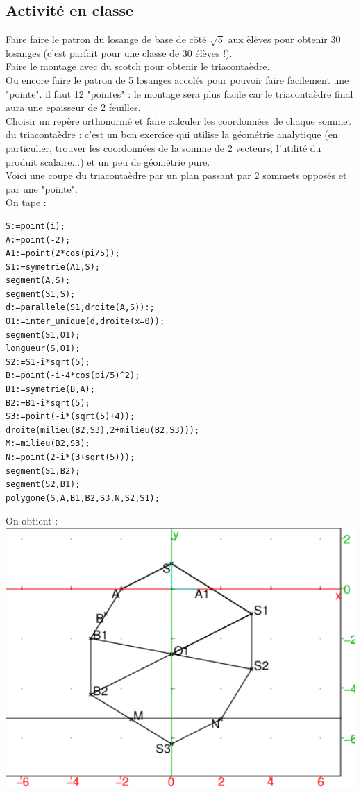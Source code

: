 \documentclass[a4paper,11pt]{book}
\begin{document}
\subsection{Activit\'e en classe}
Faire faire le patron du losange de base de c\^ot\'e $\sqrt 5$ aux \`el\`eves 
pour obtenir 30 losanges (c'est parfait pour une classe de 30 \'el\`eves !).\\
Faire le montage avec du scotch pour obtenir le triaconta\`edre.\\
Ou encore faire le patron de 5 losanges accol\'es pour pouvoir faire facilement 
une "pointe". il faut 12 "pointes" : le montage sera plus facile car le
triaconta\`edre final aura une epaisseur de 2 feuilles.\\   
Choisir un rep\`ere orthonorm\'e et faire calculer les coordonn\'ees de chaque 
sommet du triaconta\`edre : c'est un bon exercice qui utilise la g\'eom\'etrie
analytique (en particulier, trouver les coordonn\'ees de la somme de 2 vecteurs,
l'utilit\'e du produit scalaire...) et un peu de g\'eom\'etrie pure.\\
Voici une coupe du triaconta\`edre par un plan passant par 2 sommets oppos\'es 
et par une "pointe". \\
On tape :\\
\begin{verbatim}
S:=point(i);
A:=point(-2);
A1:=point(2*cos(pi/5));
S1:=symetrie(A1,S);
segment(A,S);
segment(S1,S);
d:=parallele(S1,droite(A,S)):;
O1:=inter_unique(d,droite(x=0));
segment(S1,O1);
longueur(S,O1);
S2:=S1-i*sqrt(5);
B:=point(-i-4*cos(pi/5)^2);
B1:=symetrie(B,A);
B2:=B1-i*sqrt(5);
S3:=point(-i*(sqrt(5)+4));
droite(milieu(B2,S3),2+milieu(B2,S3)));
M:=milieu(B2,S3);
N:=point(2-i*(3+sqrt(5)));
segment(S1,B2);
segment(S2,B1);
polygone(S,A,B1,B2,S3,N,S2,S1);
\end{verbatim}
On obtient :\\
\includegraphics[width=\textwidth]{triaconc}
\end{document}

